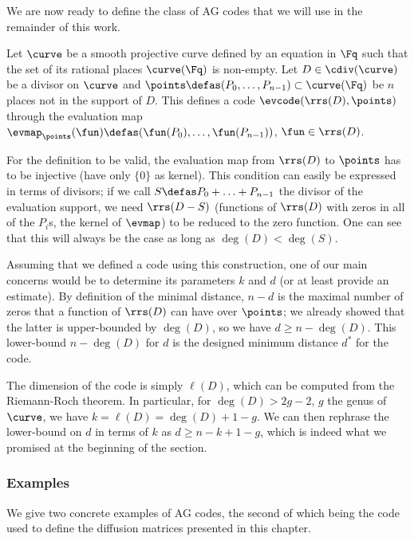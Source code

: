 We are now ready to define the class of AG codes that we will use in the remainder of this work.

Let $\curve$ be a smooth projective curve defined by an equation in $\Fq$ such that the set of its rational places $\curve(\Fq)$ is non-empty.
Let $D \in \cdiv(\curve)$ be a divisor on $\curve$ and $\points \defas (P_0, \ldots, P_{n-1}) \subset \curve(\Fq)$ be $n$ places not in the support of $D$.
This defines a code $\evcode(\rrs(D), \points)$ through the evaluation map $\evmap_\points(\fun) \defas (\fun(P_0),\ldots,\fun(P_{n-1}))$, $\fun \in \rrs(D)$.

For the definition to be valid, the evaluation map from $\rrs(D)$ to $\points$ has to be injective (\ie have only $\{0\}$ as kernel).
This condition can easily be expressed in terms of divisors; if we call $S \defas P_0 + \ldots + P_{n-1}$ the divisor of the
evaluation support, we need $\rrs(D - S)$ (\ie functions of $\rrs(D)$ with zeros in all of the $P_i$s, \ie the kernel of $\evmap$) to be reduced to the zero function.
One can see that this will always be the case as long as $\deg(D) < \deg(S)$.

\medskip

Assuming that we defined a code using this construction, one of our main concerns would be to determine its parameters $k$ and $d$ (or at least provide an estimate).
By definition of the minimal distance, $n - d$ is the maximal number of zeros that a function of $\rrs(D)$ can have
over $\points$; we already showed that the latter is upper-bounded by $\deg(D)$, so we have $d \geq n - \deg(D)$. This lower-bound
$n - \deg(D)$ for $d$ is the designed minimum distance $d^*$ for the code.

The dimension of the code is simply $\ell(D)$, which can be computed from the Riemann-Roch theorem. In particular, for $\deg(D) > 2g -2$, $g$ the genus of
$\curve$, we have $k = \ell(D) = \deg(D) + 1 - g$. We can then rephrase the lower-bound on $d$ in terms of $k$ as $d \geq n - k + 1 - g$, which is indeed
what we promised at the beginning of the section.

\subsubsection{Examples}

We give two concrete examples of AG codes, the second of which being the code used to define the diffusion matrices presented in this chapter.

